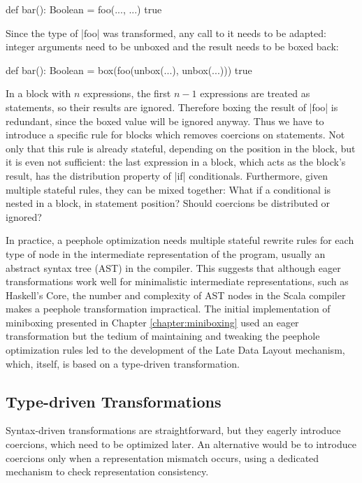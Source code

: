 \begin{lstlisting-nobreak}
 def bar(): Boolean = {
   foo(..., ...)
   true
 }
\end{lstlisting-nobreak}

Since the type of |foo| was transformed, any call to it needs to be adapted: integer arguments need to be unboxed and the result needs to be boxed back:

\begin{lstlisting-nobreak}
 def bar(): Boolean = {
   box(foo(unbox(...), unbox(...)))
   true
 }
\end{lstlisting-nobreak}

In a block with $n$ expressions, the first $n-1$ expressions are treated as statements, so their results are ignored. Therefore boxing the result of |foo| is redundant, since the boxed value will be ignored anyway. Thus we have to introduce a specific rule for blocks which removes coercions on statements. Not only that this rule is already stateful, depending on the position in the block, but it is even not sufficient: the last expression in a block, which acts as the block's result, has the distribution property of |if| conditionals. Furthermore, given multiple stateful rules, they can be mixed together: What if a conditional is nested in a block, in statement position? Should coercions be distributed or ignored?

In practice, a peephole optimization needs multiple stateful rewrite rules for each type of node in the intermediate representation of the program, usually an abstract syntax tree (AST) in the compiler. This suggests that although eager transformations work well for minimalistic intermediate representations, such as Haskell's Core, the number and complexity of AST nodes in the Scala compiler makes a peephole transformation impractical. The initial implementation of miniboxing presented in Chapter \ref{chapter:miniboxing} used an eager transformation but the tedium of maintaining and tweaking the peephole optimization rules led to the development of the Late Data Layout mechanism, which, itself, is based on a type-driven transformation.

\subsection{Type-driven Transformations}
\label{ldl:sec:problem/lazy}

Syntax-driven transformations are straightforward, but they eagerly introduce coercions, which need to be optimized later. An alternative would be to introduce coercions only when a representation mismatch occurs, using a dedicated mechanism to check representation consistency.

